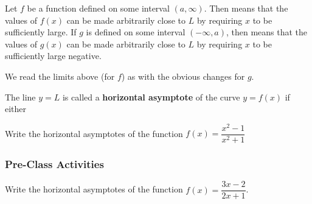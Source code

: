 \documentclass[notes]{subfiles}
\begin{document}
		\begin{defn}
			Let $f$ be a function defined on some interval $(a,\infty)$.  Then
			means that the values of $f(x)$ can be made arbitrarily close to $L$ by requiring $x$ to be sufficiently large.  If $g$ is defined on some interval $(-\infty,a)$, then
			means that the values of $g(x)$ can be made arbitrarily close to $L$ by requiring $x$ to be sufficiently large negative.
		\end{defn}
			
		We read the limits above (for $f$) as
		with the obvious changes for $g$.  
		\begin{defn}
			The line $y = L$ is called a \textbf{horizontal asymptote} of the curve $y = f(x)$ if either 
		\end{defn}
		
		\begin{ex}
			Write the horizontal asymptotes of the function $f(x) = \dfrac{x^2-1}{x^2 + 1}$
		\end{ex}
			\newpage
			
	\subsubsection*{Pre-Class Activities}	
		\begin{ex}
			Write the horizontal asymptotes of the function  $f(x) =\dfrac{3x-2}{2x+1}$.
		\end{ex}
			
\end{document}
